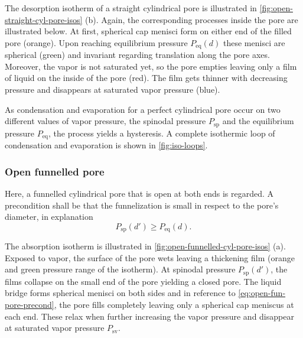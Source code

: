 \documentclass[../thesis.tex]{subfiles}
\begin{document}
                The desorption isotherm of a straight cylindrical pore is illustrated in \cref{fig:open-straight-cyl-pore-isos} (b). Again, the corresponding processes inside the pore are illustrated below. At first, spherical cap menisci form on either end of the filled pore (orange). Upon reaching equilibrium pressure $P_\mathrm{eq}(d)$ these menisci are spherical (green) and invariant regarding translation along the pore axes. Moreover, the vapor is not saturated yet, so the pore empties leaving only a film of liquid on the inside of the pore (red). The film gets thinner with decreasing pressure and disappears at saturated vapor pressure (blue).

                As condensation and evaporation for a perfect cylindrical pore occur on two different values of vapor pressure, the spinodal pressure $P_\mathrm{sp}$ and the equilibrium pressure $P_\mathrm{eq}$, the process yields a hysteresis. A complete isothermic loop of condensation and evaporation is shown in \cref{fig:iso-loops}.



            \subsubsection{Open funnelled pore}
            \label{sssec:open-funnelled-pores}

                Here, a funnelled cylindrical pore that is open at both ends is regarded. A precondition shall be that the funnelization is small in respect to the pore's diameter, in explanation
                \begin{equation}
                    P_\mathrm{sp}(d')\ge P_\mathrm{eq}(d).
                    \label{eq:open-fun-pore-precond}
                \end{equation}
                \medskip

                The absorption isotherm is illustrated in \cref{fig:open-funnelled-cyl-pore-isos} (a). Exposed to vapor, the surface of the pore wets leaving a thickening film (orange and green pressure range of the isotherm). At spinodal pressure $P_\mathrm{sp}(d')$, the films collapse on the small end of the pore yielding a closed pore. The liquid bridge forms spherical menisci on both sides and in reference to \cref{eq:open-fun-pore-precond}, the pore fills completely leaving only a spherical cap meniscus at each end. These relax when further increasing the vapor pressure and disappear at saturated vapor pressure $P_\mathrm{sv}$.
                \medskip
\end{document}
